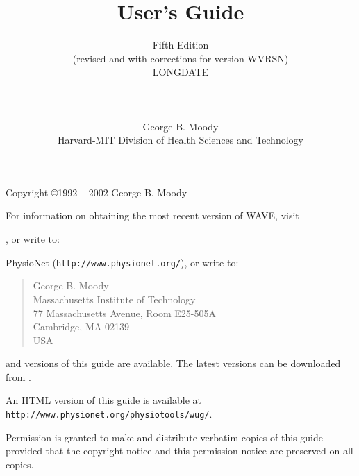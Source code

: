 \documentclass[twoside]{book}
\title{\WAVE{} User's Guide}
\author{Fifth Edition\\
(revised and with corrections for \WAVE{} version WVRSN)\\
LONGDATE\\
\\
\\
\\
George B. Moody\\
Harvard-MIT Division of Health Sciences and Technology}
\date{}
\newcommand{\WAVE}{{\sf WAVE}\xspace}
\begin{document}
\begin{htmlonly}
\end{htmlonly}
\begin{latexonly}
\end{latexonly}

\maketitle

\pagestyle{empty}
\vspace*{\fill}
\noindent
Copyright \copyright 1992 -- 2002 George B. Moody

\vspace{1 in}
\noindent
For information on obtaining the most recent version of \WAVE{},
visit
\begin{htmlonly}
, or write to:
\end{htmlonly}
\begin{latexonly}
PhysioNet ({\tt http://www.physionet.org/}), or write to:
\end{latexonly}

\begin{quote}
George B. Moody\\
Massachusetts Institute of Technology\\
77 Massachusetts Avenue, Room E25-505A\\
Cambridge, MA 02139\\
USA\\
\end{quote}

\begin{htmlonly}
\noindent
{} and
 versions of this guide are available.
The latest versions can be downloaded from
.
\end{htmlonly}
\begin{latexonly}
\noindent
An HTML version of this guide is available at
{\tt http://www.\-physio\-net.\-org/\-physio\-tools/\-wug/}.
\end{latexonly}

\vspace{0.2 in}
\noindent
Permission is granted to make and distribute verbatim copies of this
guide provided that the copyright notice and this permission notice are
preserved on all copies.
\end{document}
